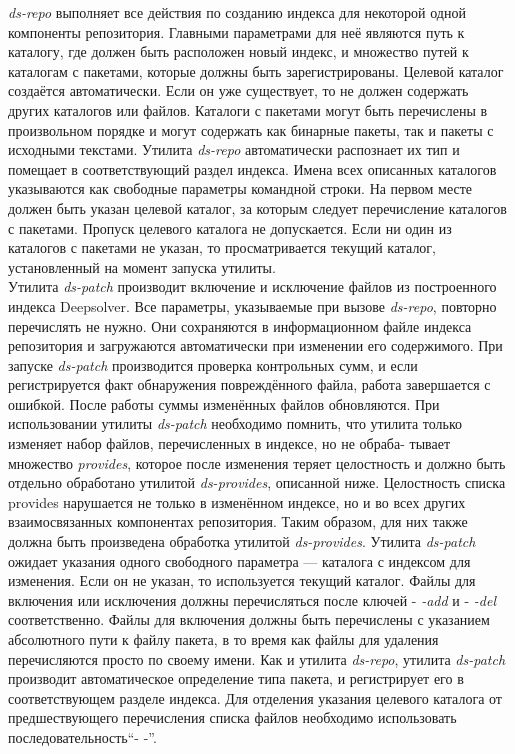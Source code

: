 \textit{ds-repo} выполняет все действия по созданию индекса для некоторой
одной компоненты репозитория. Главными параметрами для неё являются
путь к каталогу, где должен быть расположен новый индекс, и множество
путей к каталогам с пакетами, которые должны быть зарегистрированы. 
Целевой каталог создаётся автоматически. Если он уже существует, то не 
должен содержать других каталогов или файлов. Каталоги с пакетами могут
быть перечислены в произвольном порядке и могут содержать как бинарные
пакеты, так и пакеты с исходными текстами. Утилита \textit{ds-repo} автоматически
распознает их тип и помещает в соответствующий раздел индекса. Имена
всех описанных каталогов указываются как свободные параметры командной
строки. На первом месте должен быть указан целевой каталог, за которым
следует перечисление каталогов с пакетами. Пропуск целевого каталога
не допускается. Если ни один из каталогов с пакетами не указан, то 
просматривается текущий каталог, установленный на момент запуска утилиты.\\

Утилита \textit{ds-patch} производит включение и исключение файлов из построенного
индекса Deepsolver. Все параметры, указываемые при вызове\textit{ ds-repo},
повторно перечислять не нужно. Они сохраняются в информационном файле
индекса репозитория и загружаются автоматически при изменении его содержимого.
При запуске \textit{ds-patch} производится проверка контрольных сумм, и
если регистрируется факт обнаружения повреждённого файла, работа завершается
с ошибкой. После работы суммы изменённых файлов обновляются.
При использовании утилиты \textit{ds-patch} необходимо помнить, что утилита
только изменяет набор файлов, перечисленных в индексе, но не обраба-
тывает множество \textit{provides}, которое после изменения теряет целостность и
должно быть отдельно обработано утилитой \textit{ds-provides}, описанной ниже. 
Целостность списка provides нарушается не только в изменённом индексе, но и
во всех других взаимосвязанных компонентах репозитория. Таким образом,
для них также должна быть произведена обработка утилитой \textit{ds-provides}.
Утилита \textit{ds-patch} ожидает указания одного свободного параметра — каталога
с индексом для изменения. Если он не указан, то используется текущий
каталог. Файлы для включения или исключения должны перечисляться после ключей
- \textit{-add} и - \textit{-del} соответственно. Файлы для включения должны быть перечислены 
с указанием абсолютного пути к файлу пакета, в то время как файлы для удаления 
перечисляются просто по своему имени. Как и утилита \textit{ds-repo}, утилита \textit{ds-patch}
производит автоматическое определение типа пакета, и регистрирует его в
соответствующем разделе индекса. Для отделения указания целевого каталога 
от предшествующего перечисления списка файлов необходимо использовать
последовательность``- -''.\\


